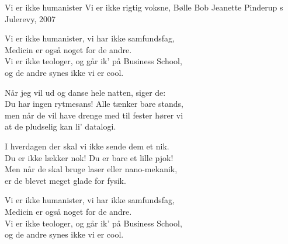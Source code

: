 \begin{song}{Vi er ikke humanister}
  {} %
  {Vi er ikke rigtig voksne, Bølle Bob} %
  {Jeanette Pinderup} %
  {\TKET{}s Julerevy, 2007} %
  {\NotCCLIed} %

  \begin{SBChorus}
    Vi er ikke humanister, vi har ikke samfundsfag,\\
    Medicin er også noget for de andre.\\
    Vi er ikke teologer, og går ik’ på Business School,\\
    og de andre synes ikke vi er cool.
  \end{SBChorus}

  \begin{SBVerse}
    Når jeg vil ud og danse hele natten, siger de:\\
    Du har ingen rytmesans! Alle tænker bare stands,\\
    men når de vil have drenge med til fester hører vi\\
    at de pludselig kan li’ datalogi.
  \end{SBVerse}

  \begin{SBVerse}
    I hverdagen der skal vi ikke sende dem et nik.\\
    Du er ikke lækker nok! Du er bare et lille pjok!\\
    Men når de skal bruge laser eller nano-mekanik,\\
    er de blevet meget glade for fysik.
  \end{SBVerse}

  \begin{SBChorus}
    Vi er ikke humanister, vi har ikke samfundsfag,\\
    Medicin er også noget for de andre.\\
    Vi er ikke teologer, og går ik’ på Business School,\\
    og de andre synes ikke vi er cool.
  \end{SBChorus}



\end{song}
